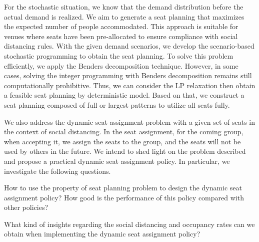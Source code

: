 For the stochastic situation, we know that the demand distribution before the actual demand is realized. We aim to generate a seat planning that maximizes the expected number of people accommodated. This approach is suitable for venues where seats have been pre-allocated to ensure compliance with social distancing rules. With the given demand scenarios, we develop the scenario-based stochastic programming to obtain the seat planning. To solve this problem efficiently, we apply the Benders decomposition technique. However, in some cases, solving the integer programming with Benders decomposition remains still computationally prohibitive. Thus, we can consider the LP relaxation then obtain a feasible seat planning by deterministic model. Based on that, we construct a seat planning composed of full or largest patterns to utilize all seats fully.



We also address the dynamic seat assignment problem with a given set of seats in the context of social distancing. In the seat assignment, for the coming group, when accepting it, we assign the seats to the group, and the seats will not be used by others in the future. We intend to shed light on the problem described and propose a practical dynamic seat assignment policy. In particular, we investigate the following questions.

How to use the property of seat planning problem to design the dynamic seat assignment policy? How good is the performance of this policy compared with other policies?

What kind of insights regarding the social distancing and occupancy rates can we obtain when implementing the dynamic seat assignment policy?




